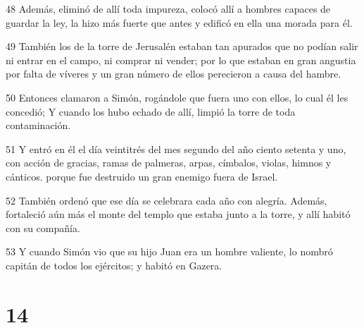 \par 48 Además, eliminó de allí toda impureza, colocó allí a hombres capaces de guardar la ley, la hizo más fuerte que antes y edificó en ella una morada para él.
\par 49 También los de la torre de Jerusalén estaban tan apurados que no podían salir ni entrar en el campo, ni comprar ni vender; por lo que estaban en gran angustia por falta de víveres y un gran número de ellos perecieron a causa del hambre.
\par 50 Entonces clamaron a Simón, rogándole que fuera uno con ellos, lo cual él les concedió; Y cuando los hubo echado de allí, limpió la torre de toda contaminación.
\par 51 Y entró en él el día veintitrés del mes segundo del año ciento setenta y uno, con acción de gracias, ramas de palmeras, arpas, címbalos, violas, himnos y cánticos. porque fue destruido un gran enemigo fuera de Israel.
\par 52 También ordenó que ese día se celebrara cada año con alegría. Además, fortaleció aún más el monte del templo que estaba junto a la torre, y allí habitó con su compañía.
\par 53 Y cuando Simón vio que su hijo Juan era un hombre valiente, lo nombró capitán de todos los ejércitos; y habitó en Gazera.

\chapter{14}

